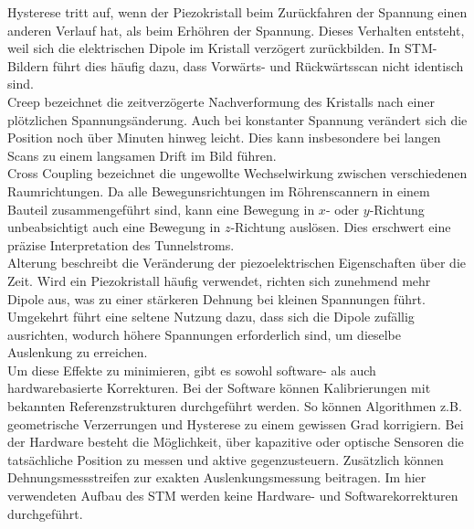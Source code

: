 Hysterese tritt auf, wenn der Piezokristall beim Zurückfahren der Spannung einen anderen Verlauf hat, als beim Erhöhren der Spannung.
Dieses Verhalten entsteht, weil sich die elektrischen Dipole im Kristall verzögert zurückbilden. In STM-Bildern führt dies häufig dazu, dass Vorwärts- und Rückwärtsscan nicht identisch sind.\\

Creep bezeichnet die zeitverzögerte Nachverformung des Kristalls nach einer plötzlichen Spannungsänderung. Auch bei konstanter Spannung verändert sich die Position noch über Minuten hinweg leicht. 
Dies kann insbesondere bei langen Scans zu einem langsamen Drift im Bild führen.\\

Cross Coupling bezeichnet die ungewollte Wechselwirkung zwischen verschiedenen Raumrichtungen. 
Da alle Bewegunsrichtungen im Röhrenscannern in einem Bauteil zusammengeführt sind, kann eine Bewegung in $x$- oder $y$-Richtung unbeabsichtigt auch eine Bewegung in $z$-Richtung auslösen. 
Dies erschwert eine präzise Interpretation des Tunnelstroms.\\

Alterung beschreibt die Veränderung der piezoelektrischen Eigenschaften über die Zeit. Wird ein Piezokristall häufig verwendet, richten sich zunehmend mehr Dipole aus, was zu einer stärkeren Dehnung bei kleinen Spannungen führt. Umgekehrt führt eine seltene Nutzung dazu, dass sich die Dipole zufällig ausrichten, wodurch höhere Spannungen erforderlich sind, um dieselbe Auslenkung zu erreichen.\\

Um diese Effekte zu minimieren, gibt es sowohl software- als auch hardwarebasierte Korrekturen.
Bei der Software können Kalibrierungen mit bekannten Referenzstrukturen durchgeführt werden.
So können Algorithmen z.B. geometrische Verzerrungen und Hysterese zu einem gewissen Grad korrigiern.
Bei der Hardware besteht die Möglichkeit, über kapazitive oder optische Sensoren die tatsächliche Position zu messen und aktive gegenzusteuern.
Zusätzlich können Dehnungsmessstreifen zur exakten Auslenkungsmessung beitragen. 
Im hier verwendeten Aufbau des STM werden keine Hardware- und Softwarekorrekturen durchgeführt. 


